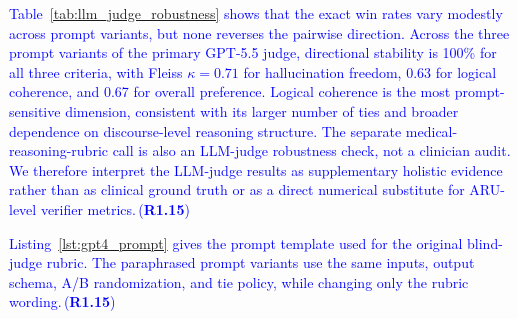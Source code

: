 \documentclass[a4paper,fleqn,doubleblind]{cas-sc}
\DeclareRobustCommand{\added}[1]{\textcolor{blue}{#1}}
\DeclareRobustCommand{\revtag}[1]{\textcolor{blue}{\scriptsize\,(\textbf{#1})}}
\begin{document}
\added{Table~\ref{tab:llm_judge_robustness} shows that the exact win rates vary modestly across prompt variants, but none reverses the pairwise direction. Across the three prompt variants of the primary GPT-5.5 judge, directional stability is 100\% for all three criteria, with Fleiss $\kappa=0.71$ for hallucination freedom, 0.63 for logical coherence, and 0.67 for overall preference. Logical coherence is the most prompt-sensitive dimension, consistent with its larger number of ties and broader dependence on discourse-level reasoning structure. The separate medical-reasoning-rubric call is also an LLM-judge robustness check, not a clinician audit. We therefore interpret the LLM-judge results as supplementary holistic evidence rather than as clinical ground truth or as a direct numerical substitute for ARU-level verifier metrics.}\revtag{R1.15}

\added{Listing~\ref{lst:gpt4_prompt} gives the prompt template used for the original blind-judge rubric. The paraphrased prompt variants use the same inputs, output schema, A/B randomization, and tie policy, while changing only the rubric wording.}\revtag{R1.15}
\end{document}
